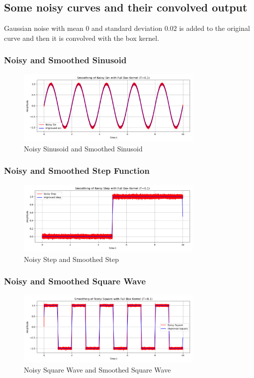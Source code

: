 \subsection{Some noisy curves and their convolved output}

Gaussian noise with mean $0$ and standard deviation $0.02$ is added to the original curve and then it is convolved with the box kernel.

\subsubsection{Noisy and Smoothed Sinusoid}
\begin{figure}[!ht]
\centering
\includegraphics[width=0.8\textwidth]{codes/codes_sin_3_and_smoothening/figs/noisy_sin_plot.png}
\caption{Noisy Sinusoid and Smoothed Sinusoid}
\end{figure}
\FloatBarrier

\subsubsection{Noisy and Smoothed Step Function}
\begin{figure}[!ht]
\centering
\includegraphics[width=0.8\textwidth]{codes/codes_sin_3_and_smoothening/figs/noisy_step_plot.png}
\caption{Noisy Step and Smoothed Step}
\end{figure}
\FloatBarrier

\subsubsection{Noisy and Smoothed Square Wave}
\begin{figure}[!ht]
\centering
\includegraphics[width=0.8\textwidth]{codes/codes_sin_3_and_smoothening/figs/noisy_square_plot.png}
\caption{Noisy Square Wave and Smoothed Square Wave}
\end{figure}
\FloatBarrier

